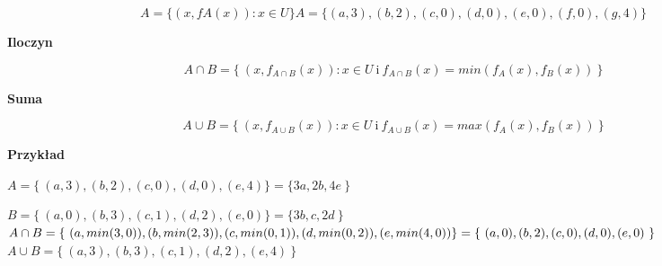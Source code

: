 $$ A=\{(x,fA(x)): x\in U\} A= \{(a,3), (b,2), (c,0), (d,0), (e,0), (f,0), (g,4)\} $$ 

\textbf{Iloczyn}

$$ A \cap B = \{ \ (x,f_{A \cap B} (x)): x \in U \ \textrm{i} \ f_{A \cap B}(x)=min(f_A(x), f_B(x)) \ \} $$

\textbf{Suma}

$$ A \cup B = \{ \ (x,f_{A \cup B} (x)): x \in U \ \textrm{i} \ f_{A \cup B}(x)=max(f_A(x), f_B(x)) \ \} $$

\textbf{Przykład}

$ A=\{\ (a,3), (b,2), (c,0), (d,0), (e,4)\} = \{3a,2b,4e\ \} $

$ B=\{\ (a,0), (b,3), (c,1), (d,2), (e,0)\} = \{3b,c,2d\ \} $ \\

$ A \cap B = \{ \ (a,min(3,0)), (b,min(2,3)), (c,min(0,1)), (d,min(0,2)), (e,min(4,0))\} \\ = \{ \ (a,0),(b,2), (c,0), (d,0), (e,0) \ \} $ \\

$ A \cup B = \{ \ (a,3), (b,3), (c,1), (d,2), (e,4) \ \} $
